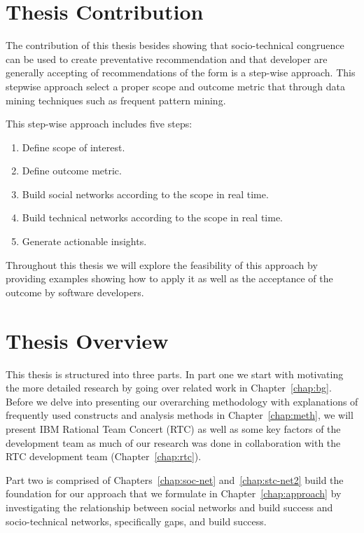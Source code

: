\section{Thesis Contribution}
The contribution of this thesis besides showing that socio-technical congruence can be used to create preventative recommendation and that developer are generally accepting of recommendations of the form is a step-wise approach.
This stepwise approach select a proper scope and outcome metric that through data mining techniques such as frequent pattern mining.

This step-wise approach includes five steps:
\begin{enumerate}
\item Define scope of interest.
\item Define outcome metric.
\item Build social networks according to the scope in real time.
\item Build technical networks according to the scope in real time.
\item Generate actionable insights.
\end{enumerate}

Throughout this thesis we will explore the feasibility of this approach by providing examples showing how to apply it as well as the acceptance of the outcome by software developers.

\section{Thesis Overview}
This thesis is structured into three parts.
In part one we start with motivating the more detailed research by going over related work in Chapter~\ref{chap:bg}.
Before we delve into presenting our overarching methodology with explanations of frequently used constructs and analysis methods in Chapter~\ref{chap:meth}, we will present IBM Rational Team Concert (RTC) as well as some key factors of the development team as much of our research was done in collaboration with the RTC development team (Chapter~\ref{chap:rtc}).

Part two is comprised of Chapters~\ref{chap:soc-net} and~\ref{chap:stc-net2} build the foundation for our approach that we formulate in Chapter~\ref{chap:approach} by investigating the relationship between social networks and build success and socio-technical networks, specifically gaps, and build success.

